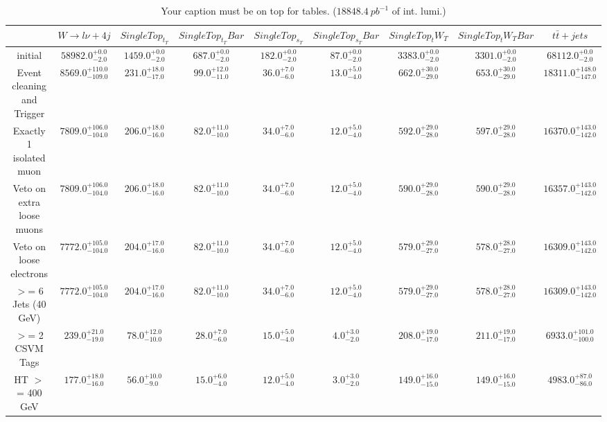 \documentclass{article}
\begin{document}
\begin{table}
\caption{Your caption must be on top for tables. ($18848.4~pb^{-1}$ of int. lumi.)}
\label{tab:}
\centering
\begin{tabular}{|c|cccccccc|}
\toprule
&$W\rightarrow l\nu + 4j$	&$SingleTop_t_T$	&$SingleTop_t_TBar$	&$SingleTop_s_T$	&$SingleTop_s_TBar$	&$SingleTop_tW_T$	&$SingleTop_tW_TBar$	&$t\bar{t}+jets$	\\

\midrule
initial&	$58982.0^{+0.0}_{-2.0}$	&$1459.0^{+0.0}_{-2.0}$	&$687.0^{+0.0}_{-2.0}$	&$182.0^{+0.0}_{-2.0}$	&$87.0^{+0.0}_{-2.0}$	&$3383.0^{+0.0}_{-2.0}$	&$3301.0^{+0.0}_{-2.0}$	&$68112.0^{+0.0}_{-2.0}$	\\

Event cleaning and Trigger&	$8569.0^{+110.0}_{-109.0}$	&$231.0^{+18.0}_{-17.0}$	&$99.0^{+12.0}_{-11.0}$	&$36.0^{+7.0}_{-6.0}$	&$13.0^{+5.0}_{-4.0}$	&$662.0^{+30.0}_{-29.0}$	&$653.0^{+30.0}_{-29.0}$	&$18311.0^{+148.0}_{-147.0}$	\\

Exactly 1 isolated muon&	$7809.0^{+106.0}_{-104.0}$	&$206.0^{+18.0}_{-16.0}$	&$82.0^{+11.0}_{-10.0}$	&$34.0^{+7.0}_{-6.0}$	&$12.0^{+5.0}_{-4.0}$	&$592.0^{+29.0}_{-28.0}$	&$597.0^{+29.0}_{-28.0}$	&$16370.0^{+143.0}_{-142.0}$	\\

Veto on extra loose muons&	$7809.0^{+106.0}_{-104.0}$	&$206.0^{+18.0}_{-16.0}$	&$82.0^{+11.0}_{-10.0}$	&$34.0^{+7.0}_{-6.0}$	&$12.0^{+5.0}_{-4.0}$	&$590.0^{+29.0}_{-28.0}$	&$590.0^{+29.0}_{-28.0}$	&$16357.0^{+143.0}_{-142.0}$	\\

Veto on loose electrons&	$7772.0^{+105.0}_{-104.0}$	&$204.0^{+17.0}_{-16.0}$	&$82.0^{+11.0}_{-10.0}$	&$34.0^{+7.0}_{-6.0}$	&$12.0^{+5.0}_{-4.0}$	&$579.0^{+29.0}_{-27.0}$	&$578.0^{+28.0}_{-27.0}$	&$16309.0^{+143.0}_{-142.0}$	\\

$>$= 6 Jets (40 GeV)&	$7772.0^{+105.0}_{-104.0}$	&$204.0^{+17.0}_{-16.0}$	&$82.0^{+11.0}_{-10.0}$	&$34.0^{+7.0}_{-6.0}$	&$12.0^{+5.0}_{-4.0}$	&$579.0^{+29.0}_{-27.0}$	&$578.0^{+28.0}_{-27.0}$	&$16309.0^{+143.0}_{-142.0}$	\\

$>$= 2 CSVM Tags&	$239.0^{+21.0}_{-19.0}$	&$78.0^{+12.0}_{-10.0}$	&$28.0^{+7.0}_{-6.0}$	&$15.0^{+5.0}_{-4.0}$	&$4.0^{+3.0}_{-2.0}$	&$208.0^{+19.0}_{-17.0}$	&$211.0^{+19.0}_{-17.0}$	&$6933.0^{+101.0}_{-100.0}$	\\

HT $>$=  400 GeV&	$177.0^{+18.0}_{-16.0}$	&$56.0^{+10.0}_{-9.0}$	&$15.0^{+6.0}_{-4.0}$	&$12.0^{+5.0}_{-4.0}$	&$3.0^{+3.0}_{-2.0}$	&$149.0^{+16.0}_{-15.0}$	&$149.0^{+16.0}_{-15.0}$	&$4983.0^{+87.0}_{-86.0}$	\\

\bottomrule
\end{tabular}
\end{table}
\end{document}
